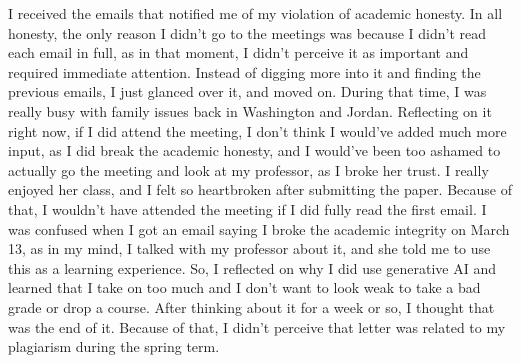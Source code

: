 \documentclass[notitlepage]{report}
\begin{document}









  I received the emails that notified me of my violation of academic honesty.
  In all honesty, the only reason I didn't go to the meetings was because I
  didn't read each email in full, as in that moment, I didn't perceive it as
  important and required immediate attention. Instead of digging more into it
  and finding the previous emails, I just glanced over it, and moved on. During
  that time, I was really busy with family issues back in Washington and
  Jordan. Reflecting on it right now, if I did attend the meeting, I don't
  think I would've added much more input, as I did break the academic honesty,
  and I would've been too ashamed to actually go the meeting and look at my
  professor, as I broke her trust. I really enjoyed her class, and I felt so
  heartbroken after submitting the paper. Because of that, I wouldn't have
  attended the meeting if I did fully read the first email. I was confused when
  I got an email saying I broke the academic integrity on March 13, as in my
  mind, I talked with my professor about it, and she told me to use this as a
  learning experience. So, I reflected on why I did use generative AI and
  learned that I take on too much and I don't want to look weak to take a bad
  grade or drop a course. After thinking about it for a week or so, I thought
  that was the end of it. Because of that, I didn't perceive that letter was
  related to my plagiarism during the spring term.
\end{document}

